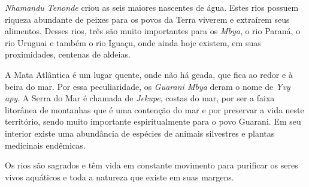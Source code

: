  

 


 

\emph{Nhamandu Tenonde} criou as seis maiores nascentes de água. Estes
rios possuem riqueza abundante de peixes para os povos da Terra viverem
e extraírem seus alimentos. Desses rios, três são muito importantes para
os \emph{Mbya}, o rio Paraná, o rio Uruguai e também o rio Iguaçu, onde
ainda hoje existem, em suas proximidades, centenas de aldeias.

A Mata Atlântica é um lugar quente, onde não há geada, que fica ao redor
e à beira do mar. Por essa peculiaridade, os \emph{Guarani Mbya} deram o
nome de \emph{Yvy apy}. A Serra do Mar é chamada de \emph{Jekupe},
costas do mar, por ser a faixa litorânea de montanhas que é uma
contenção do mar e por preservar a vida neste território, sendo muito
importante espiritualmente para o povo Guarani. Em seu interior existe
uma abundância de espécies de animais silvestres e plantas medicinais
endêmicas.


 

Os rios são sagrados e têm vida em constante movimento para purificar os
seres vivos aquáticos e toda a natureza que existe em suas margens.

 

